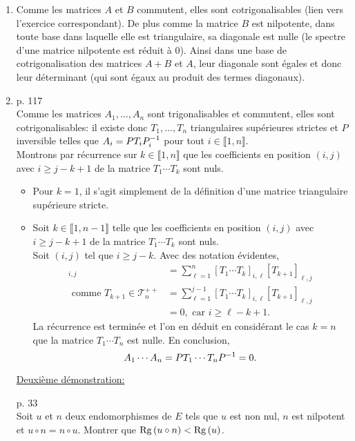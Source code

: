 \begin{solution}
    \begin{enumerate}
        \item Comme les matrices $A$ et $B$ commutent, elles sont cotrigonalisables (lien vers l'exercice correspondant). De plus comme la matrice $B$ est nilpotente, dans toute base dans laquelle elle est triangulaire, sa diagonale est nulle (le spectre d'une matrice nilpotente est réduit à $0$). Ainsi dans une base de cotrigonalisation des matrices $A+B$ et $A$, leur diagonale sont égales et donc leur déterminant (qui sont égaux au produit des termes diagonaux).
        \item \cite{reduc_des_endo} p. 117 \\
        Comme les matrices $A_1, \dots, A_n$ sont trigonalisables et commutent, elles sont cotrigonalisables: il existe donc $T_1, \dots, T_n$ triangulaires supérieures strictes et $P$ inversible telles que $A_i = P T_i P_i^{-1}$ pour tout $i \in \llbracket 1, n \rrbracket$. \\
        Montrons par récurrence sur $k \in \llbracket 1, n \rrbracket$ que les coefficients en position $(i, j)$ avec $i \geqslant j - k + 1$ de la matrice $T_1 \cdots T_k$ sont nuls. 
        \begin{itemize}
            \item Pour $k=1$, il s'agit simplement de la définition d'une matrice triangulaire supérieure stricte. 
            \item Soit $k \in \llbracket 1, n-1 \rrbracket$ telle que les coefficients en position $(i, j)$ avec $i \geqslant j - k + 1$ de la matrice $T_1 \cdots T_k$ sont nuls. \\
            Soit $(i, j)$ tel que $i \geqslant j - k$. Avec des notation évidentes, 
            \begin{align*}
                [T_1 \cdots T_{k+1}]_{i,j} &= \sum_{\ell=1}^n [T_1 \cdots T_k]_{i, \ell} [T_{k+1}]_{\ell, j} \\
                \text{ comme } T_{k+1} \in \mathscr{T}_n^{++} &= \sum_{\ell=1}^{j-1} [T_1 \cdots T_k]_{i, \ell} [T_{k+1}]_{\ell, j} \\
                &= 0, \text{ car } i \geqslant \ell - k +1.
            \end{align*}
            La récurrence est terminée et l'on en déduit en considérant le cas $k = n$ que la matrice $T_1 \cdots T_n$ est nulle. En conclusion,
            $$A_1 \cdots A_n = P T_1 \cdots T_n P^{-1} = 0.$$
        \end{itemize}
        \underline{Deuxième démonstration:} \\
        \begin{lemme}
            \cite{reduc_des_endo} p. 33\\
            Soit $u$ et $n$ deux endomorphismes de $E$ tels que $u$ est non nul, $n$ est nilpotent et $u \circ n = n \circ u$. Montrer que $\mathrm{Rg}\,(u \circ n) < \mathrm{Rg}\,(u)$.
        \end{lemme}
        \begin{preuve}
            

\end{preuve}
\end{enumerate}
\end{solution}
